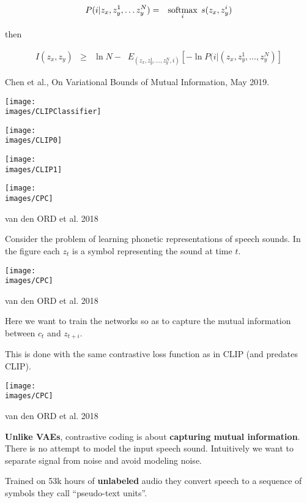 {{\huge
\begin{eqnarray*}
P(i|z_x,z_y^1,\ldots z_y^N) & = & \operatorname*{softmax}_i\;s(z_x,z_y^i)
\end{eqnarray*}
}

then

{\huge
\begin{eqnarray*}
I(z_x,z_y) & \geq & \ln N - \;\;E_{(z_x,z_y^1,\ldots,z_y^N,i)}\left[-\ln P(i|(z_x,z_y^1,\ldots,z_y^N)\right]
\end{eqnarray*}
}

Chen et al., On Variational Bounds of Mutual Information, May 2019.


\centerline{\texttt{[image: \\images/CLIPClassifier]}}


\centerline{\texttt{[image: \\images/CLIP0]}}


\centerline{\texttt{[image: \\images/CLIP1]}}


\centerline{\texttt{[image: \\images/CPC]}}
\centerline{\huge van den ORD et al. 2018}

\vfill
Consider the problem of learning phonetic representations of speech sounds.  In the figure each $z_t$ is a symbol representing the sound at time $t$.


\centerline{\texttt{[image: \\images/CPC]}}
\centerline{\huge van den ORD et al. 2018}

\vfill
Here we want to train the networks so as to capture the mutual information between $c_t$ and $z_{t+i}$.

\vfill
This is done with the same contrastive loss function as in CLIP (and predates CLIP).

\centerline{\texttt{[image: \\images/CPC]}}
\centerline{\huge van den ORD et al. 2018}

\vfill
{\bf Unlike VAEs}, contrastive coding is about {\bf capturing mutual information}. There is no attempt to model the input speech sound.
Intuitively we want to separate signal from noise and avoid modeling noise.


\vfill
Trained on 53k hours of {\bf unlabeled} audio they convert speech to a sequence of symbols they call ``pseudo-text units''.

}
